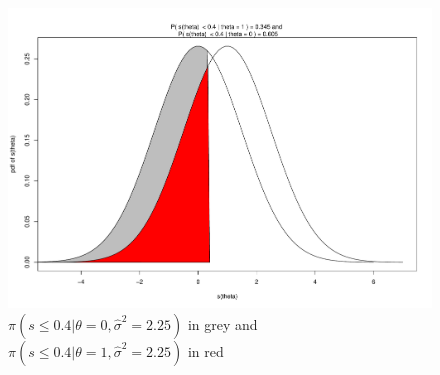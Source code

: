\documentclass[paper=a4,12pt,DIV=11,twoside=false]{scrartcl}
\begin{document}
\begin{figure}[h]
\centering
\includegraphics[width=\textwidth]{pdf_1.pdf}
\caption{$\pi(s \leq 0.4 | \theta = 0, \hat{\sigma}^2 =  2.25)$ in grey and $\pi(s \leq 0.4 | \theta = 1, \hat{\sigma}^2 =  2.25)$ in red}
\label{fig:pdf_1}
\end{figure}
\end{document}
